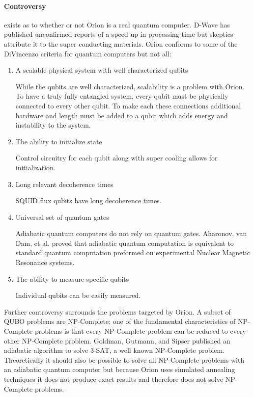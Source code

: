 \documentclass[10pt]{article}
\begin{document}
\paragraph{Controversy} exists as to whether or not Orion is a real quantum computer.  D-Wave has published unconfirmed reports of a speed up in processing time but skeptics attribute it to the super conducting materials.  Orion conforms to some of the DiVincenzo criteria for quantum computers but not all:
  \begin{enumerate}
  \item A scalable physical system with well characterized qubits
  
  While the qubits are well characterized, scalability is a problem with Orion.  To have a truly fully entangled system, every qubit must be physically connected to every other qubit.  To make each these connections additional hardware and length must be added to a qubit which adds energy and instability to the system.
  \item The ability to initialize state

  Control circuitry for each qubit along with super cooling allows for initialization.

  \item Long relevant decoherence times

  SQUID flux qubits have long decoherence times.

  \item Universal set of quantum gates
  
  Adiabatic quantum computers do not rely on quantum gates.  Aharonov, van Dam, et al. proved that adiabatic quantum computation is equivalent to standard quantum computation preformed on experimental Nuclear Magnetic Resonance systems.

  \item The ability to measure specific qubits

  Individual qubits can be easily measured.

 \end{enumerate}

Further controversy surrounds the problems targeted by Orion.  A subset of QUBO problems are NP-Complete; one of the fundamental characteristics of NP-Complete problems is that every NP-Complete problem can be reduced to every other NP-Complete problem.  Goldman, Gutmann, and Sipser published an adiabatic algorithm to solve 3-SAT, a well known NP-Complete problem.  Theoretically it should also be possible to solve all NP-Complete problems with an adiabatic quantum computer but because Orion uses simulated annealing techniques it does not produce exact results and therefore does not solve NP-Complete problems.
\end{document}
